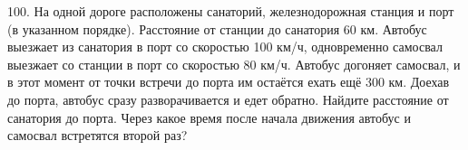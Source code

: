 100. На одной дороге расположены санаторий, железнодорожная станция и порт (в указанном порядке). Расстояние от станции до санатория 60 км. Автобус выезжает из санатория в порт со скоростью 100 км/ч, одновременно самосвал выезжает со станции в порт со скоростью 80 км/ч. Автобус догоняет самосвал, и в этот момент от точки встречи до порта им остаётся ехать ещё 300 км. Доехав до порта, автобус сразу разворачивается и едет обратно. Найдите расстояние от санатория до порта. Через какое время после начала движения автобус и самосвал встретятся второй раз?\\
